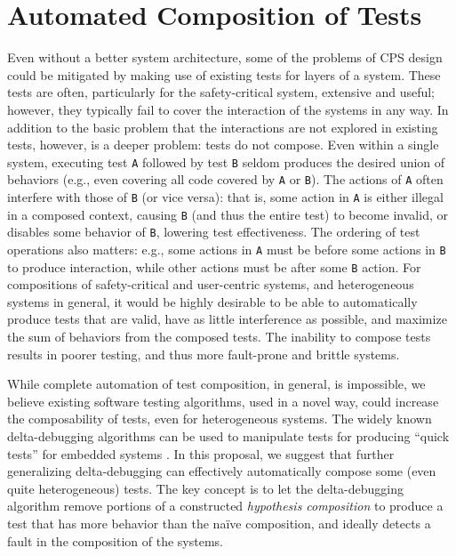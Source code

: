 \section{Automated Composition of Tests}
Even without a better system architecture, some of the problems of CPS design could be mitigated by making use of existing tests for layers of a system.  These tests are often,
particularly for the safety-critical system, extensive and useful;
however, they typically fail to cover the interaction of the systems
in any way.  In addition to the basic problem that the interactions
are not explored in existing tests, however, is a deeper problem:
tests do not compose.  Even within a single system, executing test
{\tt A}
followed by test {\tt B} seldom produces the desired union of behaviors
(e.g., even covering all code covered by {\tt A} or {\tt B}).  The
actions of {\tt A}
often interfere with those of {\tt B} (or vice versa): that is, some action
in {\tt A} is either illegal in a composed context, causing {\tt B} (and thus the
entire test) to become invalid, or
disables some behavior of {\tt B}, lowering test effectiveness.  The
ordering of test operations also matters: e.g., some actions in {\tt A} must be
before some actions in {\tt B} to produce interaction, while other actions
must be after some {\tt B} action.    For compositions of safety-critical and
user-centric systems, and heterogeneous systems in general, it would
be highly desirable to be able to automatically produce tests that are
valid, have as little interference as possible, and maximize the sum
of behaviors from the composed tests.  The inability to compose tests
results in poorer testing, and thus more fault-prone and brittle
systems.

While complete automation of test composition, in general, is
impossible, we 
believe existing software testing algorithms, used in a  novel
way, could increase the composability of tests, even for
heterogeneous systems.  The widely known delta-debugging algorithms can
be used to manipulate tests for producing ``quick tests'' for embedded
systems \cite{icst2014}.  In this proposal, we suggest that further generalizing
delta-debugging can effectively automatically compose some (even quite heterogeneous) tests.  The key
concept is to let the delta-debugging algorithm remove portions of a
constructed \emph{hypothesis composition} to produce a test that has more
behavior than the na\"ive composition, and ideally detects a fault in
the composition of the systems.

